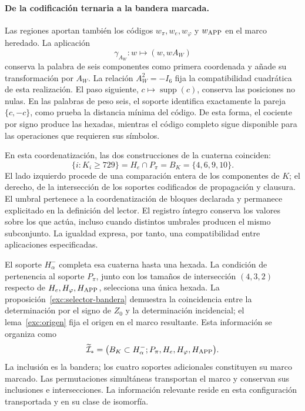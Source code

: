 \paragraph{De la codificación ternaria a la bandera marcada.}
\label{inc-ampl-bandera}
Las regiones aportan también los códigos $w_\pi,w_e,w_\varphi$ y
$w_{\rm APP}$ en el marco heredado. La aplicación
\[
 \gamma_{A_W}:w\longmapsto(w,wA_W)
\]
conserva la palabra de seis componentes como primera coordenada y añade
su transformación por $A_W$. La relación $A_W^2=-I_6$ fija la
compatibilidad cuadrática de esta realización. El paso siguiente,
$c\mapsto\operatorname{supp}(c)$, conserva las posiciones no nulas.
En las palabras de peso seis, el soporte identifica exactamente la pareja
$\{c,-c\}$, como prueba la distancia mínima del código. De esta forma,
el cociente por signo produce las hexadas, mientras el código completo
sigue disponible para las operaciones que requieren sus símbolos.

En esta coordenatización, las dos construcciones de la cuaterna coinciden:
\begin{equation}
 \{i:K_i\geq729\}
 =H_e\cap P_\pi=B_K=\{4,6,9,10\}.
 \label{inc-ampl-cuaterna}
\end{equation}
El lado izquierdo procede de una comparación entera de los componentes
de $K$; el derecho, de la intersección de los soportes codificados de
propagación y clausura. El umbral pertenece a la coordenatización de bloques
declarada y permanece explicitado en la definición del lector. El
registro íntegro conserva los valores sobre los que actúa, incluso cuando
distintos umbrales producen el mismo subconjunto. La igualdad expresa,
por tanto, una compatibilidad entre aplicaciones especificadas.

El soporte $H^-_\alpha$ completa esa cuaterna hasta una hexada. La
condición de pertenencia al soporte $P_\pi$, junto con los tamaños de
intersección $(4,3,2)$ respecto de $H_e,H_\varphi,H_{\rm APP}$,
selecciona una única hexada. La proposición~\ref{exc:selector-bandera}
demuestra la coincidencia entre la determinación por el signo de $Z_0$
y la determinación incidencial; el lema~\ref{exc:origen} fija el origen
en el marco resultante. Esta información se organiza como
\begin{equation}
 \widetilde{\mathcal I}_*
 =\bigl(B_K\subset H^-_\alpha;
         P_\pi,H_e,H_\varphi,H_{\rm APP}\bigr).
 \label{inc-ampl-marco}
\end{equation}
La inclusión es la bandera; los cuatro soportes adicionales constituyen
su marco marcado. Las permutaciones simultáneas transportan el marco y
conservan sus inclusiones e intersecciones. La información relevante reside
en esta configuración transportada y en su clase de isomorfía.

